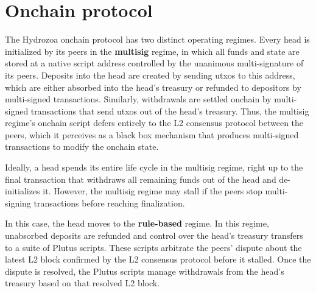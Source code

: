\documentclass[../hydrozoa.tex]{subfiles}
\begin{document}
\chapter{Onchain protocol}%
\label{h:onchain-protocol}

The Hydrozoa onchain protocol has two distinct operating regimes.
Every head is initialized by its peers in the \textbf{multisig} regime, in which all funds and state are stored at a native script address controlled by the unanimous multi-signature of its peers.
Deposits into the head are created by sending utxos to this address, which are either absorbed into the head's treasury or refunded to depositors by multi-signed transactions.
Similarly, withdrawals are settled onchain by multi-signed transactions that send utxos out of the head's treasury.
Thus, the multisig regime's onchain script defers entirely to the L2 consensus protocol between the peers, which it perceives as a black box mechanism that produces multi-signed transactions to modify the onchain state.

Ideally, a head spends its entire life cycle in the multisig regime, right up to the final transaction that withdraws all remaining funds out of the head and de-initializes it.
However, the multisig regime may stall if the peers stop multi-signing transactions before reaching finalization.

In this case, the head moves to the \textbf{rule-based} regime.
In this regime, unabsorbed deposits are refunded and control over the head's treasury transfers to a suite of Plutus scripts. 
These scripts arbitrate the peers' dispute about the latest L2 block confirmed by the L2 consensus protocol before it stalled.
Once the dispute is resolved, the Plutus scripts manage withdrawals from the head's treasury based on that resolved L2 block.
\end{document}
